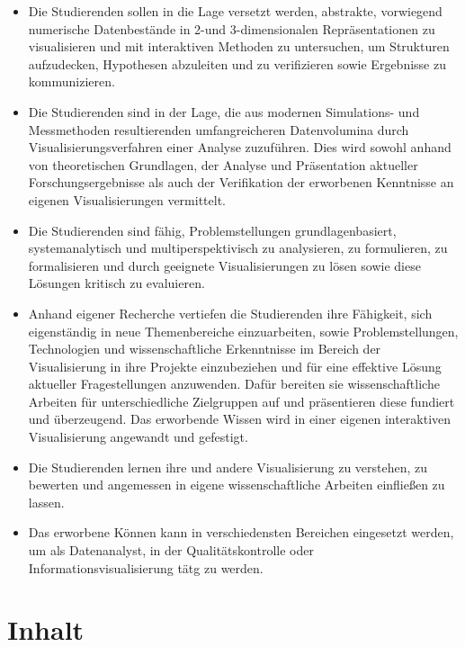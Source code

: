 \begin{itemize}
\tightlist
\item
  Die Studierenden sollen in die Lage versetzt werden, abstrakte,
  vorwiegend numerische Datenbestände in 2-und 3-dimensionalen
  Repräsentationen zu visualisieren und mit interaktiven Methoden zu
  untersuchen, um Strukturen aufzudecken, Hypothesen abzuleiten und zu
  verifizieren sowie Ergebnisse zu kommunizieren.
\item
  Die Studierenden sind in der Lage, die aus modernen Simulations- und
  Messmethoden resultierenden umfangreicheren Datenvolumina durch
  Visualisierungsverfahren einer Analyse zuzuführen. Dies wird sowohl
  anhand von theoretischen Grundlagen, der Analyse und Präsentation
  aktueller Forschungsergebnisse als auch der Verifikation der
  erworbenen Kenntnisse an eigenen Visualisierungen vermittelt.
\item
  Die Studierenden sind fähig, Problemstellungen grundlagenbasiert,
  systemanalytisch und multiperspektivisch zu analysieren, zu
  formulieren, zu formalisieren und durch geeignete Visualisierungen zu
  lösen sowie diese Lösungen kritisch zu evaluieren.
\item
  Anhand eigener Recherche vertiefen die Studierenden ihre Fähigkeit,
  sich eigenständig in neue Themenbereiche einzuarbeiten, sowie
  Problemstellungen, Technologien und wissenschaftliche Erkenntnisse im
  Bereich der Visualisierung in ihre Projekte einzubeziehen und für eine
  effektive Lösung aktueller Fragestellungen anzuwenden. Dafür bereiten
  sie wissenschaftliche Arbeiten für unterschiedliche Zielgruppen auf
  und präsentieren diese fundiert und überzeugend. Das erworbende Wissen
  wird in einer eigenen interaktiven Visualisierung angewandt und
  gefestigt.
\item
  Die Studierenden lernen ihre und andere Visualisierung zu verstehen,
  zu bewerten und angemessen in eigene wissenschaftliche Arbeiten
  einfließen zu lassen.
\item
  Das erworbene Können kann in verschiedensten Bereichen eingesetzt
  werden, um als Datenanalyst, in der Qualitätskontrolle oder
  Informationsvisualisierung tätg zu werden.
\end{itemize}

\section*{Inhalt\label{/mi-2017/modulbeschreibungen-master/MA_VC_Modul_Visualisierung}}\label{inhaltpathlabelmi-2017modulbeschreibungen-mastermaux5fvcux5fmodulux5fvisualisierung}

